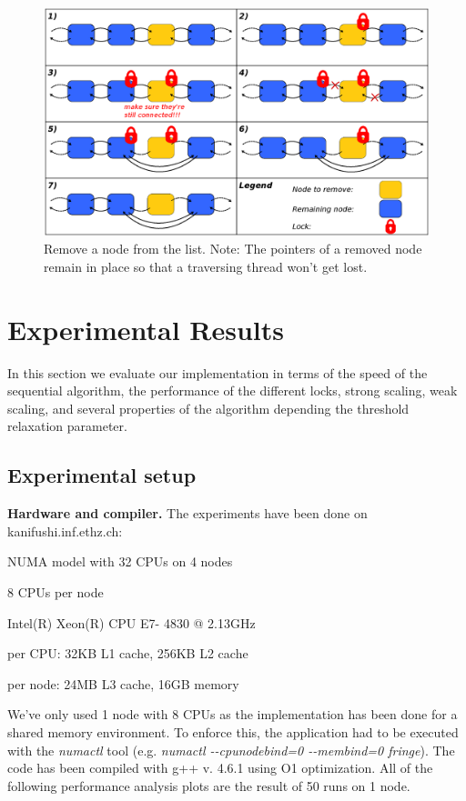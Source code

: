 \documentclass[letterpaper]{article}
\newcommand{\mypar}[1]{{\bf #1.}}
\begin{document}
\begin{figure}[h]\centering
  \includegraphics[scale=0.31]{remove.eps}
  \caption{Remove a node from the list. Note: The pointers of a removed node remain in place so that a traversing thread won't get lost. \label{fig:remove}}
\end{figure}



\section{Experimental Results}\label{sec:exp}

In this section we evaluate our implementation in terms of the speed of the sequential algorithm, the performance of the different locks, strong scaling, weak scaling, and several properties of the algorithm depending the threshold relaxation parameter.

\subsection{Experimental setup}\label{ssec:setup}

\mypar{Hardware and compiler}
The experiments have been done on kanifushi.inf.ethz.ch:
\begin{compactitem}
\item NUMA model with 32 CPUs on 4 nodes
\item 8 CPUs per node
\item Intel(R) Xeon(R) CPU E7- 4830 @ 2.13GHz
\item per CPU: 32KB L1 cache, 256KB L2 cache
\item per node: 24MB L3 cache, 16GB memory
\end{compactitem}
We've only used 1 node with 8 CPUs as the implementation has been done for a shared memory environment. To enforce this, the application had to be executed with the \textit{numactl} tool (e.g. \textit{numactl -{}-cpunodebind=0 -{}-membind=0 fringe}). The code has been compiled with g++ v. 4.6.1 using O1 optimization. All of the following performance analysis plots are the result of 50 runs on 1 node.
\end{document}
